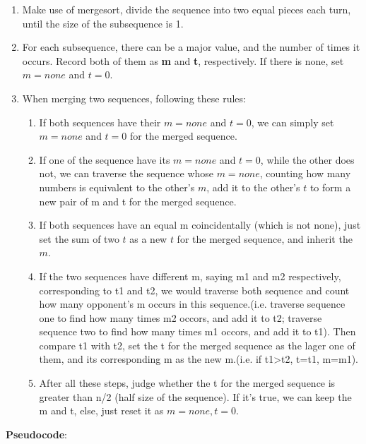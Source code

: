 \documentclass{article}
\begin{document}
\begin{enumerate}
	\item Make use of mergesort, divide the sequence into two equal pieces each turn, until the size of the subsequence is 1.
	\item For each subsequence, there can be a major value, and the number of times it occurs. Record both of them as \textbf{m} and \textbf{t}, respectively. If there is none, set $m = none$ and $t = 0$.
	\item When merging two sequences, following these rules:
	      \begin{enumerate}
		      \item If both sequences have their $m=none$ and $t=0$, we can simply set $m=none$ and $t=0$ for the merged sequence.
		      \item If one of the sequence have its $m=none$ and $t=0$, while the other does not, we can traverse the sequence whose $m=none$, counting how many numbers is equivalent to the other's $m$, add it to the other's $t$ to form a new pair of m and t for the merged sequence.
		      \item If both sequences have an equal m coincidentally (which is not none), just set the sum of two $t$ as a new $t$ for the merged sequence, and inherit the $m$.
		      \item If the two sequences have different m, saying m1 and m2 respectively, corresponding to t1 and t2, we would traverse both sequence and count how many opponent's m occurs in this sequence.(i.e. traverse sequence one to find how many times m2 occors, and add it to t2; traverse sequence two to find how many times m1 occors, and add it to t1). Then compare t1 with t2, set the t for the merged sequence as the lager one of them, and its corresponding m as the new m.(i.e. if t1>t2, t=t1, m=m1).
		      \item After all these steps, judge whether the t for the merged sequence is greater than n/2 (half size of the sequence). If it's true, we can keep the m and t, else, just reset it as $m=none,t=0$.
	      \end{enumerate}
\end{enumerate}

\textbf{Pseudocode}:
\end{document}
